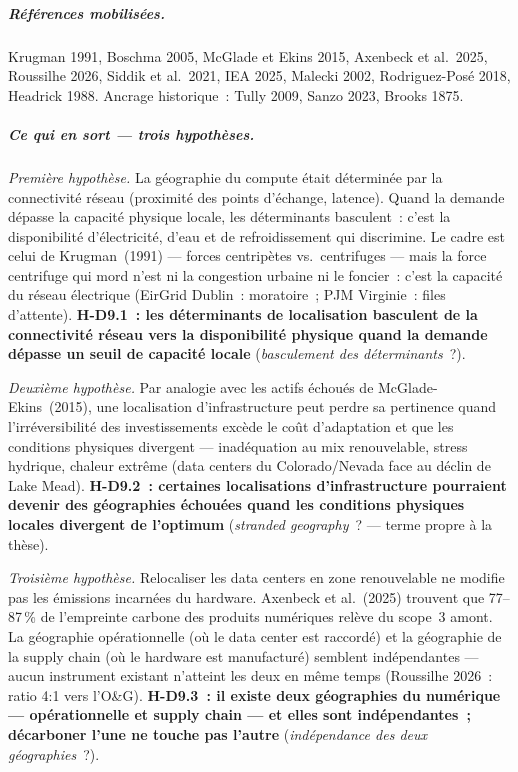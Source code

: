\subparagraph{R\'ef\'erences mobilis\'ees.}
Krugman 1991, Boschma 2005, McGlade et Ekins 2015, Axenbeck et al.\ 2025, Roussilhe 2026, Siddik et al.\ 2021, IEA 2025, Malecki 2002, Rodriguez-Pos\'e 2018, Headrick 1988. Ancrage historique~: Tully 2009, Sanzo 2023, Brooks 1875.

\subparagraph{Ce qui en sort --- trois hypoth\`eses.}

\emph{Premi\`ere hypoth\`ese.} La g\'eographie du compute \'etait d\'etermin\'ee par la connectivit\'e r\'eseau (proximit\'e des points d'\'echange, latence). Quand la demande d\'epasse la capacit\'e physique locale, les d\'eterminants basculent~: c'est la disponibilit\'e d'\'electricit\'e, d'eau et de refroidissement qui discrimine. Le cadre est celui de Krugman~(1991) --- forces centripètes vs.\ centrifuges --- mais la force centrifuge qui mord n'est ni la congestion urbaine ni le foncier~: c'est la capacit\'e du r\'eseau \'electrique (EirGrid Dublin~: moratoire~; PJM Virginie~: files d'attente). \textbf{H-D9.1~: les d\'eterminants de localisation basculent de la connectivit\'e r\'eseau vers la disponibilit\'e physique quand la demande d\'epasse un seuil de capacit\'e locale} (\emph{basculement des d\'eterminants}~?).

\emph{Deuxi\`eme hypoth\`ese.} Par analogie avec les actifs \'echou\'es de McGlade-Ekins~(2015), une localisation d'infrastructure peut perdre sa pertinence quand l'irr\'eversibilit\'e des investissements exc\`ede le co\^ut d'adaptation et que les conditions physiques divergent --- inad\'equation au mix renouvelable, stress hydrique, chaleur extr\^eme (data centers du Colorado/Nevada face au d\'eclin de Lake Mead). \textbf{H-D9.2~: certaines localisations d'infrastructure pourraient devenir des g\'eographies \'echou\'ees quand les conditions physiques locales divergent de l'optimum} (\emph{stranded geography}~? --- terme propre \`a la th\`ese).

\emph{Troisi\`eme hypoth\`ese.} Relocaliser les data centers en zone renouvelable ne modifie pas les \'emissions incarn\'ees du hardware. Axenbeck et al.~(2025) trouvent que 77--87\,\% de l'empreinte carbone des produits num\'eriques rel\`eve du scope~3 amont. La g\'eographie op\'erationnelle (o\`u le data center est raccord\'e) et la g\'eographie de la supply chain (o\`u le hardware est manufactur\'e) semblent ind\'ependantes --- aucun instrument existant n'atteint les deux en m\^eme temps (Roussilhe 2026~: ratio 4:1 vers l'O\&G). \textbf{H-D9.3~: il existe deux g\'eographies du num\'erique --- op\'erationnelle et supply chain --- et elles sont ind\'ependantes~; d\'ecarboner l'une ne touche pas l'autre} (\emph{ind\'ependance des deux g\'eographies}~?).

